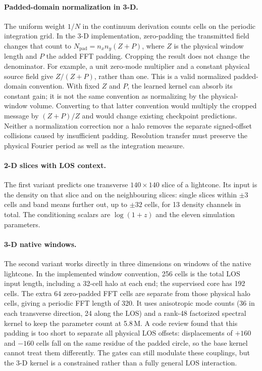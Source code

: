 \paragraph{Padded-domain normalization in 3-D.} The uniform weight $1/N$ in the continuum derivation counts cells on the periodic integration grid. In the 3-D implementation, zero-padding the transmitted field changes that count to $N_{\mathrm{pad}}=n_xn_y(Z+P)$, where $Z$ is the physical window length and $P$ the added FFT padding. Cropping the result does not change the denominator. For example, a unit zero-mode multiplier and a constant physical source field give $Z/(Z+P)$, rather than one. This is a valid normalized padded-domain convention. With fixed $Z$ and $P$, the learned kernel can absorb its constant gain; it is not the same convention as normalizing by the physical-window volume. Converting to that latter convention would multiply the cropped message by $(Z+P)/Z$ and would change existing checkpoint predictions. Neither a normalization correction nor a halo removes the separate signed-offset collisions caused by insufficient padding. Resolution transfer must preserve the physical Fourier period as well as the integration measure.

\paragraph{2-D slices with LOS context.} The first variant predicts one transverse $140\times140$ slice of a lightcone. Its input is the density on that slice and on the neighbouring slices: single slices within $\pm3$ cells and band means further out, up to $\pm32$ cells, for 13 density channels in total. The conditioning scalars are $\log(1+z)$ and the eleven simulation parameters.

\paragraph{3-D native windows.} The second variant works directly in three dimensions on windows of the native lightcone. In the implemented window convention, 256 cells is the total LOS input length, including a 32-cell halo at each end; the supervised core has 192 cells. The extra 64 zero-padded FFT cells are separate from those physical halo cells, giving a periodic FFT length of 320. It uses anisotropic mode counts (36 in each transverse direction, 24 along the LOS) and a rank-48 factorized spectral kernel to keep the parameter count at 5.8\,M. A code review found that this padding is too short to separate all physical LOS offsets: displacements of $+160$ and $-160$ cells fall on the same residue of the padded circle, so the base kernel cannot treat them differently. The gates can still modulate these couplings, but the 3-D kernel is a constrained rather than a fully general LOS interaction.

